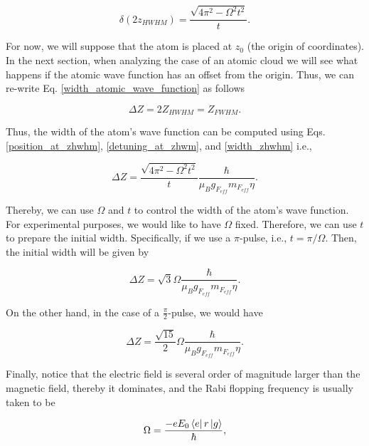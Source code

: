 \documentclass{article}
\begin{document}
\begin{equation}\label{detuning_at_zhwm}
\delta (2z_{HWHM}) = \frac{\sqrt{4 \pi^{2} - \Omega^{2} t^{2}}}{t}.
\end{equation}

For now, we will suppose that the atom is placed at $z_{0}$ (the origin of coordinates). In the next section, when analyzing the case of an atomic cloud we will see what happens if the atomic wave function has an offset from the origin. Thus, we can re-write Eq. \ref{width_atomic_wave_function} as follows

\begin{equation}\label{width_zhwhm}
  \Delta Z = 2Z_{HWHM} = Z_{FWHM}.
\end{equation}

Thus, the width of the atom's wave function can be computed using Eqs.  \ref{position_at_zhwhm}, \ref{detuning_at_zhwm}, and \ref{width_zhwhm} i.e.,

\begin{equation}
\Delta Z = \frac{\sqrt{4 \pi^{2} - \Omega^{2} t^{2}}}{t} \frac{\hbar}{\mu_{B} g_{F_{eff}} m_{F_{eff}} \eta}.
\end{equation}

Thereby, we can use $\Omega$ and $t$ to control the width of the atom's wave function. For experimental purposes, we would like to have $\Omega$ fixed. Therefore, we can use $t$ to prepare the initial width. Specifically, if we use a $\pi$-pulse, i.e., $t=\pi/\Omega$. Then, the initial width will be given by

\begin{equation}\label{initial_width}
\Delta Z = \sqrt{3} \Omega \frac{\hbar}{\mu_{B} g_{F_{eff}} m_{F_{eff}} \eta}.
\end{equation}

On the other hand, in the case of a $\frac{\pi}{2}$-pulse, we would have

\begin{equation}\label{initial_width_pi/2}
\Delta Z = \frac{\sqrt{15}}{2} \Omega \frac{\hbar}{\mu_{B} g_{F_{eff}} m_{F_{eff}} \eta}.
\end{equation}

Finally, notice that the electric field is several order of magnitude larger than the magnetic field, thereby it dominates, and the Rabi flopping frequency is usually taken to be

\begin{equation*}
\Omega = \frac{- e E_{0} \bra{e} r \ket{g}}{\hbar},
\end{equation*}
\end{document}
